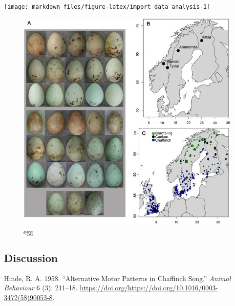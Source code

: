 \documentclass[
]{article}
\begin{document}
\texttt{[image: markdown\_files/figure-latex/import data analysis-1]}

\begin{figure}
\includegraphics[width=0.3\linewidth]{figures/egg-figure} \caption{egg}\label{fig:egg-figure}
\end{figure}

\hypertarget{discussion}{%
\subsection*{\texorpdfstring{\textbf{Discussion}}{Discussion}}\label{discussion}}

\hypertarget{refs}{}
\leavevmode\hypertarget{ref-Hinde}{}%
Hinde, R. A. 1958. ``Alternative Motor Patterns in Chaffinch Song.'' \emph{Animal Behaviour} 6 (3): 211--18. \url{https://doi.org/https://doi.org/10.1016/0003-3472(58)90053-8}.
\end{document}
